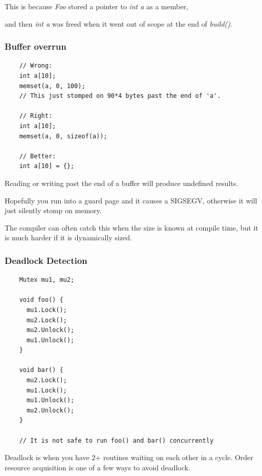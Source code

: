 \documentclass{article}
\begin{document}
This is because \textit{Foo} stored a pointer to \textit{int a} as a member,

and then \textit{int a} was freed when it went out of scope at the end of \textit{build()}.

\subsubsection{Buffer overrun}

\begin{verbatim}
    // Wrong:
    int a[10];
    memset(a, 0, 100);
    // This just stomped on 90*4 bytes past the end of 'a'.
    
    // Right:
    int a[10];
    memset(a, 0, sizeof(a));

    // Better:
    int a[10] = {};

\end{verbatim}

Reading or writing past the end of a buffer will produce undefined results.

\vspace*{1em}

Hopefully you run into a guard page and it causes a SIGSEGV, otherwise it will just silently stomp on memory. 

\vspace*{0.5em}

The compiler can often catch this when the size is known at compile time, but it is much harder if it is dynamically sized.

\subsubsection{Deadlock Detection}

\begin{verbatim}
    Mutex mu1, mu2;

    void foo() {
      mu1.Lock();
      mu2.Lock();
      mu2.Unlock();
      mu1.Unlock();
    }
    
    void bar() {
      mu2.Lock();
      mu1.Lock();
      mu1.Unlock();
      mu2.Unlock();
    }
    
    // It is not safe to run foo() and bar() concurrently    
\end{verbatim}

Deadlock is when you have 2+ routines waiting on each other in a cycle. Order resource acquisition is one of a few ways to avoid deadlock. 

\vspace*{1em}
\end{document}
